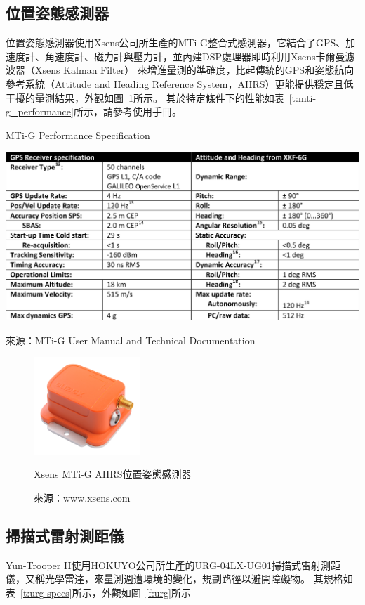 \subsection{位置姿態感測器}
位置姿態感測器使用Xsens公司所生產的MTi-G整合式感測器，它結合了GPS、加速度計、角速度計、磁力計與壓力計，並內建DSP處理器即時利用Xsens卡爾曼濾波器（Xsens Kalman Filter）
來增進量測的準確度，比起傳統的GPS和姿態航向參考系統（Attitude and Heading Reference System，AHRS）更能提供穩定且低干擾的量測結果，外觀如圖~\ref{f:MTi-G}所示。
其於特定條件下的性能如表~\ref{t:mti-g_performance}所示，請參考使用手冊\cite{Xsens:2012:MTiG_Manual}。

\begin{table}[h!]
	\centering
	\caption{MTi-G Performance Specification}
	\label{t:mti-g_performance}
	\includegraphics[width=\textwidth]{tables/MTi-G_Performance}
	\caption*{來源：MTi-G User Manual and Technical Documentation\cite{Xsens:2012:MTiG_Manual}}
\end{table}

\begin{figure}[h!]
	\centering
	\includegraphics[width=4cm]{figures/hardware/MTi-G}
	\caption{Xsens MTi-G AHRS位置姿態感測器}
	\caption*{來源：www.xsens.com}
	\label{f:MTi-G}
\end{figure}

\subsection{掃描式雷射測距儀}
Yun-Trooper II使用HOKUYO公司所生產的URG-04LX-UG01掃描式雷射測距儀，又稱光學雷達，來量測週遭環境的變化，規劃路徑以避開障礙物。
其規格如表~\ref{t:urg-specs}所示，外觀如圖~\ref{f:urg}所示

